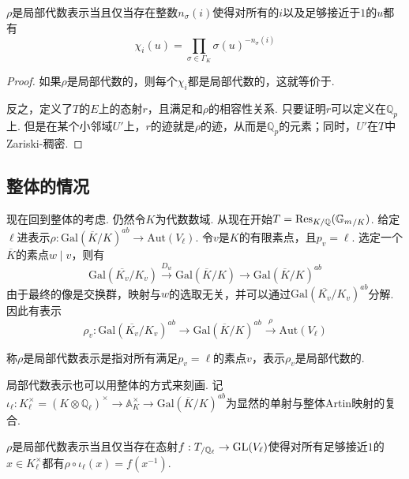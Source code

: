\begin{cprop}
    $\rho$是局部代数表示当且仅当存在整数$n_{\sigma}(i)$使得对所有的$i$以及足够接近于$1$的$u$都有
    \begin{equation}
        \chi_i(u) = \prod_{\sigma\in \Gamma_K} \sigma(u)^{-n_{\sigma}(i)} \label{eqns::temp::1}
    \end{equation}
\end{cprop}

\begin{proof}
    如果$\rho$是局部代数的，则每个$\chi_i$都是局部代数的，这就等价于.

    反之，定义了$T$的$E$上的态射$r$，且满足和$\rho$的相容性关系. 只要证明$r$可以定义在$\mathbb{Q}_p$上. 但是在某个小邻域$U'$上，$r$的迹就是$\rho$的迹，从而是$\mathbb{Q}_p$的元素；同时，$U'$在$T$中Zariski-稠密.
\end{proof}

\subsection*{整体的情况}
现在回到整体的考虑. 仍然令$K$为代数数域.
从现在开始$T=\mathrm{Res}_{K/\mathbb{Q}}({\mathbb{G}_m}_{/K})$.
给定$\ell$进表示$\rho: \mathrm{Gal}(\overline{K}/K)^{ab}\to \mathrm{Aut}(V_{\ell})$. 令$v$是$K$的有限素点，且$p_v = \ell$. 选定一个$\overline{K}$的素点$w\mid v$，则有
\begin{equation}
    \mathrm{Gal}(\overline{K_v}/K_v) \xrightarrow{D_{w}} \mathrm{Gal}(\overline{K}/K) \to \mathrm{Gal}(\overline{K}/K)^{ab}
\end{equation}
由于最终的像是交换群，映射与$w$的选取无关，并可以通过$\mathrm{Gal}(\overline{K_v}/K_v)^{ab}$分解. 因此有表示
\begin{equation}
    \rho_v: \mathrm{Gal}(\overline{K_v}/K_v)^{ab} \to \mathrm{Gal}(\overline{K}/K)^{ab} \xrightarrow{\rho} \mathrm{Aut}(V_{\ell})
\end{equation}

\begin{cdef}
    称$\rho$是局部代数表示是指对所有满足$p_v=\ell$的素点$v$，表示$\rho_v$是局部代数的.
\end{cdef}

局部代数表示也可以用整体的方式来刻画. 记$\iota_{\ell}: K_{\ell}^{\times}=(K\otimes \mathbb{Q}_{\ell})^{\times} \to \mathbb{A}_{K}^{\times} \to \mathrm{Gal}(\overline{K}/K)^{ab}$为显然的单射与整体Artin映射的复合.

\begin{cprop}
    $\rho$是局部代数表示当且仅当存在态射$f: {T}_{/\mathbb{Q}_{\ell}} \to \mathrm{GL}(V_{\ell})$使得对所有足够接近$1$的$x\in K_{\ell}^{\times}$都有$\rho\circ \iota_{\ell}(x) = f(x^{-1})$.
\end{cprop}

